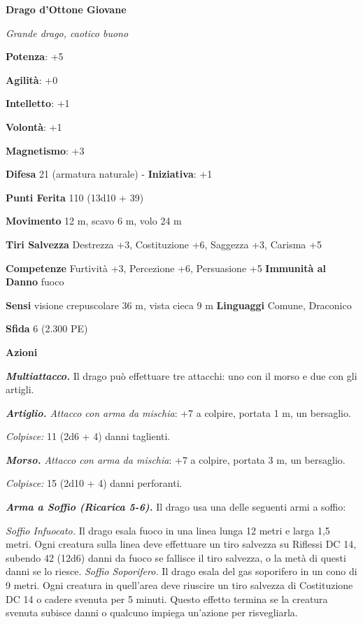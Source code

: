 \begin{multicols}{2}
\textbf{Drago d'Ottone Giovane}

\emph{Grande drago, caotico buono}

\textbf{Potenza}: +5

\textbf{Agilità}: +0

\textbf{Intelletto}: +1

\textbf{Volontà}: +1

\textbf{Magnetismo}: +3

\textbf{Difesa} 21 (armatura naturale) - \textbf{Iniziativa}: +1

\textbf{Punti Ferita} 110 (13d10 + 39)

\textbf{Movimento} 12 m, scavo 6 m, volo 24 m

\textbf{Tiri Salvezza} Destrezza +3, Costituzione +6, Saggezza +3,
Carisma +5

\textbf{Competenze} Furtività +3, Percezione +6, Persuasione +5
\textbf{Immunità al Danno} fuoco

\textbf{Sensi} visione crepuscolare 36 m, vista cieca 9 m
\textbf{Linguaggi} Comune, Draconico

\textbf{Sfida} 6 (2.300 PE)\smallskip

\smallskip\textbf{Azioni}

\emph{\textbf{Multiattacco.}} Il drago può effettuare tre attacchi: uno
con il morso e due con gli artigli.

\emph{\textbf{Artiglio.} Attacco con arma da mischia}: +7 a colpire,
portata 1 m, un bersaglio.

\emph{Colpisce:} 11 (2d6 + 4) danni taglienti.

\emph{\textbf{Morso.} Attacco con arma da mischia}: +7 a colpire,
portata 3 m, un bersaglio.

\emph{Colpisce:} 15 (2d10 + 4) danni perforanti.

\emph{\textbf{Arma a Soffio (Ricarica 5-6).}} Il drago usa una delle
seguenti armi a soffio:

\emph{Soffio Infuocato.} Il drago esala fuoco in una linea lunga 12
metri e larga 1,5 metri. Ogni creatura sulla linea deve effettuare un
tiro salvezza su Riflessi DC 14, subendo 42 (12d6) danni da fuoco se
fallisce il tiro salvezza, o la metà di questi danni se lo riesce.
\emph{Soffio Soporifero.} Il drago esala del gas soporifero in un cono
di 9 metri. Ogni creatura in quell'area deve riuscire un tiro salvezza
di Costituzione DC 14 o cadere svenuta per 5 minuti. Questo effetto
termina se la creatura svenuta subisce danni o qualcuno impiega
un'azione per risvegliarla.


\end{multicols}

